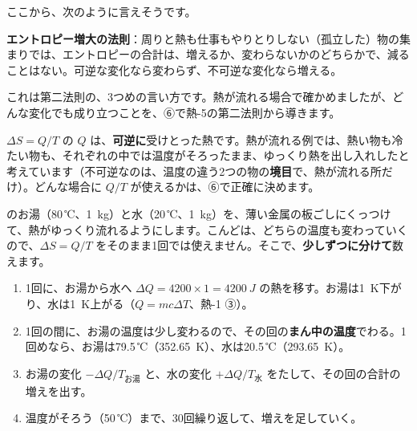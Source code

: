 ここから、次のように言えそうです。
\begin{taisetsu}
\textbf{エントロピー増大の法則}：周りと熱も仕事もやりとりしない（孤立した）物の集まりでは、エントロピーの合計は、増えるか、変わらないかのどちらかで、減ることはない。可逆な変化なら変わらず、不可逆な変化なら増える。
\end{taisetsu}
これは第二法則の、3つめの言い方です。熱が流れる場合で確かめましたが、どんな変化でも成り立つことを、⑥で熱-5の第二法則から導きます。

\begin{seikaku}
$\Delta S=Q/T$ の $Q$ は、\textbf{可逆に}受けとった熱です。熱が流れる例では、熱い物も冷たい物も、それぞれの中では温度がそろったまま、ゆっくり熱を出し入れしたと考えています（不可逆なのは、温度の違う2つの物の\textbf{境目}で、熱が流れる所だけ）。どんな場合に $Q/T$ が使えるかは、⑥で正確に決めます。
\end{seikaku}


\label{ph:熱-6:sec3}
\bkhatenaref のお湯（80\,℃、\qty{1}{kg}）と水（20\,℃、\qty{1}{kg}）を、薄い金属の板ごしにくっつけて、熱がゆっくり流れるようにします。こんどは、どちらの温度も変わっていくので、$\Delta S=Q/T$ をそのまま1回では使えません。そこで、\textbf{少しずつに分けて}数えます。

\begin{enumerate}[label={\bkcircled{\arabic*}}, leftmargin=2.4\zw, itemsep=1pt, topsep=2pt]
\item 1回に、お湯から水へ $\Delta Q=4200\times1=\qty{4200}{J}$ の熱を移す。お湯は\qty{1}{K}下がり、水は\qty{1}{K}上がる（$Q=mc\Delta T$、熱-1 ③）。
\item 1回の間に、お湯の温度は少し変わるので、その回の\textbf{まん中の温度}でわる。1回めなら、お湯は79.5\,℃（\qty{352.65}{K}）、水は20.5\,℃（\qty{293.65}{K}）。
\item お湯の変化 $-\Delta Q/T_{\text{お湯}}$ と、水の変化 $+\Delta Q/T_{\text{水}}$ をたして、その回の合計の増えを出す。
\item 温度がそろう（50\,℃）まで、30回繰り返して、増えを足していく。
\end{enumerate}

